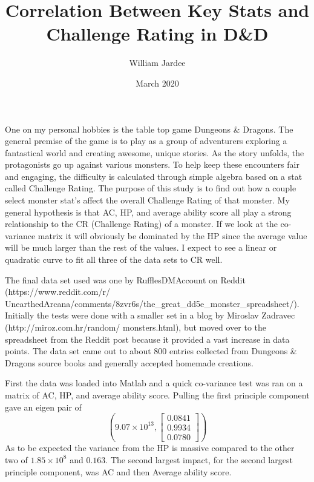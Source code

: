 \documentclass{article}
\title{Correlation Between Key Stats and Challenge Rating in D\&D}
\author{William Jardee}
\date{March 2020}
\begin{document}
\maketitle

\par One on my personal hobbies is the table top game Dungeons \& Dragons. The general premise of the game is to play as a group of adventurers exploring a fantastical world and creating awesome, unique stories. As the story unfolds, the protagonists go up against various monsters. To help keep these encounters fair and engaging, the difficulty is calculated through simple algebra based on a stat called Challenge Rating. The purpose of this study is to find out how a couple select monster stat's affect the overall Challenge Rating of that monster. My general hypothesis is that AC, HP, and average ability score all play a strong relationship to the CR (Challenge Rating) of a monster. If we look at the co-variance matrix it will obviously be dominated by the HP since the average value will be much larger than the rest of the values. I expect to see a linear or quadratic curve to fit all three of the data sets to CR well.
\par The final data set used was one by RufflesDMAccount on Reddit (https://www.reddit.com/r/
UnearthedArcana/comments/8zvr6s/the\_great\_dd5e\_monster\_spreadsheet/). Initially the tests were done with a smaller set in a blog by Miroslav Zadravec (http://miroz.com.hr/random/ monsters.html), but moved over to the spreadsheet from the Reddit post because it provided a vast increase in data points. The data set came out to about 800 entries collected from Dungeons \& Dragons source books and generally accepted homemade creations.

\par First the data was loaded into Matlab and a quick co-variance test was ran on a matrix of AC, HP, and average ability score. Pulling the first principle component gave an eigen pair of 
$$\left( 9.07\times 10^{13}, \begin{bmatrix}0.0841\\0.9934\\0.0780\end{bmatrix}\right)$$
As to be expected the variance from the HP is massive compared to the other two of $1.85\times 10^8$ and $0.163$. The second largest impact, for the second largest principle component, was AC and then Average ability score.
\end{document}

